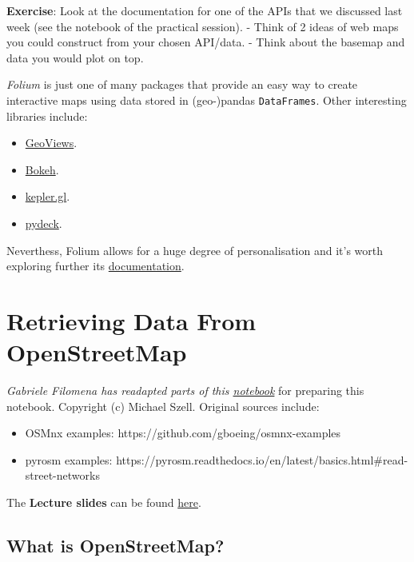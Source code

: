 \documentclass[
  letterpaper,
  DIV=11,
  numbers=noendperiod]{scrreprt}
\providecommand{\tightlist}{%
  \setlength{\itemsep}{0pt}\setlength{\parskip}{0pt}}\usepackage{longtable,booktabs,array}
\begin{document}
\textbf{Exercise}: Look at the documentation for one of the APIs that we
discussed last week (see the notebook of the practical session). - Think
of 2 ideas of web maps you could construct from your chosen API/data. -
Think about the basemap and data you would plot on top.

\emph{Folium} is just one of many packages that provide an easy way to
create interactive maps using data stored in (geo-)pandas
\texttt{DataFrames}. Other interesting libraries include:

\begin{itemize}
\tightlist
\item
  \href{https://geoviews.org/}{GeoViews}.
\item
  \href{https://docs.bokeh.org/en/latest/docs/gallery.html}{Bokeh}.
\item
  \href{https://docs.kepler.gl/docs/keplergl-jupyter}{kepler.gl}.
\item
  \href{https://deckgl.readthedocs.io/en/latest/}{pydeck}.
\end{itemize}

Neverthess, Folium allows for a huge degree of personalisation and it's
worth exploring further its
\href{https://python-visualization.github.io/folium/latest/reference.html}{documentation}.


\chapter{Retrieving Data From
OpenStreetMap}\label{retrieving-data-from-openstreetmap}

\emph{Gabriele Filomena has readapted parts of this
\href{https://github.com/mszell/geospatialdatascience/blob/main/unit08_openstreetmap/lecture08.ipynb}{notebook}}
for preparing this notebook. Copyright (c) Michael Szell. Original
sources include:

\begin{itemize}
\tightlist
\item
  OSMnx examples: https://github.com/gboeing/osmnx-examples
\item
  pyrosm examples:
  https://pyrosm.readthedocs.io/en/latest/basics.html\#read-street-networks
\end{itemize}

The \textbf{Lecture slides} can be found
\href{https://github.com/GDSL-UL/wma/raw/main/html/w07.html}{here}.

\section{What is OpenStreetMap?}\label{what-is-openstreetmap}
\end{document}
